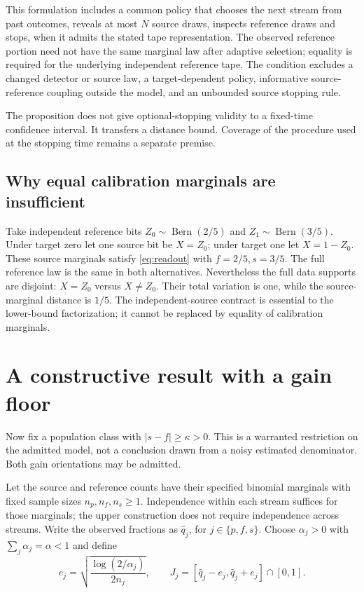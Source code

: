 \documentclass[11pt,a4paper]{article}
\newcommand{\Bern}{\operatorname{Bern}}
\begin{document}
This formulation includes a common policy that chooses the next stream from past outcomes, reveals at most $N$ source draws, inspects reference draws and stops, when it admits the stated tape representation. The observed reference portion need not have the same marginal law after adaptive selection; equality is required for the underlying independent reference tape. The condition excludes a changed detector or source law, a target-dependent policy, informative source-reference coupling outside the model, and an unbounded source stopping rule.

The proposition does not give optional-stopping validity to a fixed-time confidence interval. It transfers a distance bound. Coverage of the procedure used at the stopping time remains a separate premise.

\subsection{Why equal calibration marginals are insufficient}

Take independent reference bits $Z_0\sim\Bern(2/5)$ and $Z_1\sim\Bern(3/5)$. Under target zero let one source bit be $X=Z_0$; under target one let $X=1-Z_0$. These source marginals satisfy \eqref{eq:readout} with $f=2/5,s=3/5$. The full reference law is the same in both alternatives. Nevertheless the full data supports are disjoint: $X=Z_0$ versus $X\ne Z_0$. Their total variation is one, while the source-marginal distance is $1/5$. The independent-source contract is essential to the lower-bound factorization; it cannot be replaced by equality of calibration marginals.

\section{A constructive result with a gain floor}

Now fix a population class with $|s-f|\ge\kappa>0$. This is a warranted restriction on the admitted model, not a conclusion drawn from a noisy estimated denominator. Both gain orientations may be admitted.

Let the source and reference counts have their specified binomial marginals with fixed sample sizes $n_p,n_f,n_s\ge1$. Independence within each stream suffices for those marginals; the upper construction does not require independence across streams. Write the observed fractions as $\widehat q_j$, for $j\in\{p,f,s\}$. Choose $\alpha_j>0$ with $\sum_j\alpha_j=\alpha<1$ and define
\begin{equation}
 e_j=\sqrt{\frac{\log(2/\alpha_j)}{2n_j}},\qquad
 J_j=[\widehat q_j-e_j,\widehat q_j+e_j]\cap[0,1].
 \label{eq:intervals}
\end{equation}
\end{document}
